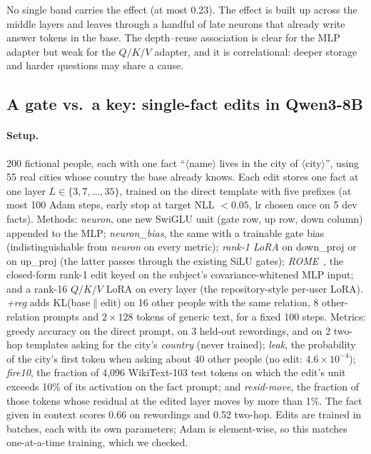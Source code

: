 \documentclass[11pt]{article}
\begin{document}
No single band carries the effect (at most 0.23). The effect is built
up across the middle layers and leaves through a handful of late
neurons that already write answer tokens in the base. The depth--reuse
association is clear for the MLP adapter but weak for the $Q/K/V$
adapter, and it is correlational: deeper storage and harder questions
may share a cause.

\subsection{A gate vs.\ a key: single-fact edits in Qwen3-8B}
\label{app:followup-t6}

\paragraph{Setup.} 200 fictional people, each with one fact
``$\langle$name$\rangle$ lives in the city of $\langle$city$\rangle$'',
using 55 real cities whose country the base already knows. Each edit
stores one fact at one layer $L\in\{3,7,\dots,35\}$, trained on the
direct template with five prefixes (at most 100 Adam steps, early stop
at target NLL $<0.05$, lr chosen once on 5 dev facts). Methods:
\emph{neuron}, one new SwiGLU unit (gate row, up row, down column)
appended to the MLP; \emph{neuron\_bias}, the same with a trainable
gate bias (indistinguishable from \emph{neuron} on every metric);
\emph{rank-1 LoRA} on down\_proj or on up\_proj (the latter passes
through the existing SiLU gates); \emph{ROME}~\citep{meng2022rome},
the closed-form rank-1 edit keyed on the subject's
covariance-whitened MLP input; and a rank-16 $Q/K/V$ LoRA on every
layer (the repository-style per-user LoRA). \emph{+reg} adds
KL(base$\|$edit) on 16 other people with the same relation, 8
other-relation prompts and $2\times128$ tokens of generic text, for a
fixed 100 steps. Metrics: greedy accuracy on the direct prompt, on 3
held-out rewordings, and on 2 two-hop templates asking for the city's
\emph{country} (never trained); \emph{leak}, the probability of the
city's first token when asking about 40 other people (no edit:
$4.6\times10^{-4}$); \emph{fire10}, the fraction of 4{,}096
WikiText-103 test tokens on which the edit's unit exceeds 10\% of its
activation on the fact prompt; and \emph{resid-move}, the fraction of
those tokens whose residual at the edited layer moves by more than 1\%.
The fact given in context scores 0.66 on rewordings and 0.52 two-hop.
Edits are trained in batches, each with its own parameters; Adam is
element-wise, so this matches one-at-a-time training, which we checked.
\end{document}

